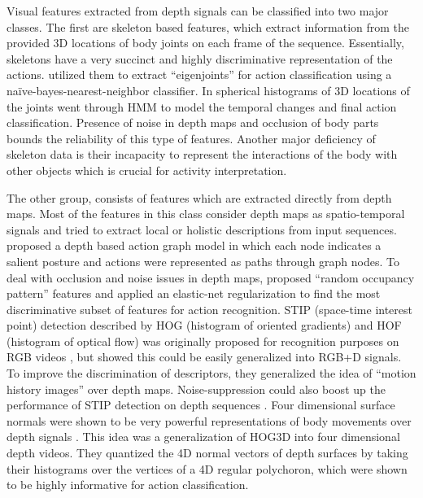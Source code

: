 \documentclass[9pt,technote,compsoc]{IEEEtran}
\begin{document}
Visual features extracted from depth signals can be classified into two major classes. The first are skeleton based features, which extract information from the provided 3D locations of body joints on each frame of the sequence. Essentially, skeletons have a very succinct and highly discriminative representation of the actions.  \cite{eigenjointsJournal} utilized them to extract ``eigenjoints'' for action classification using a na\"{i}ve-bayes-nearest-neighbor classifier. In \cite{HOJ3D} spherical histograms of 3D locations of the joints went through HMM to model the temporal changes and final action classification. Presence of noise in depth maps and occlusion of body parts bounds the reliability of this type of features. Another major deficiency of skeleton data is their incapacity to represent the interactions of the body with other objects which is crucial for activity interpretation.


The other group, consists of features which are extracted directly from depth maps. Most of the features in this class consider depth maps as spatio-temporal signals and tried to extract local or holistic descriptions from input sequences. \cite{msraction3ddataset} proposed a depth based action graph model in which each node indicates a salient posture and actions were represented as paths through graph nodes. To deal with occlusion and noise issues in depth maps, \cite{wangECCV12robust} proposed ``random occupancy pattern'' features and applied an elastic-net regularization \cite{elasticnet} to find the most discriminative subset of features for action recognition. STIP (space-time interest point) detection described by HOG (histogram of oriented gradients) \cite{HOG} and HOF (histogram of optical flow) was originally proposed for recognition purposes on RGB videos \cite{laptev2003spacetime}, but \cite{rgbdhudaact} showed this could be easily generalized into RGB+D signals. To improve the discrimination of descriptors, they generalized the idea of ``motion history images'' \cite{bobick2001PAMI_MHI} over depth maps. Noise-suppression could also boost up the performance of STIP detection on depth sequences \cite{xiaCVPR13spatio}. Four dimensional surface normals were shown to be very powerful representations of body movements over depth signals \cite{HON4D}. This idea was a generalization of HOG3D \cite{hog3d} into four dimensional depth videos. They quantized the 4D normal vectors of depth surfaces by taking their histograms over the vertices of a 4D regular polychoron, which were shown to be highly informative for action classification.
\end{document}
